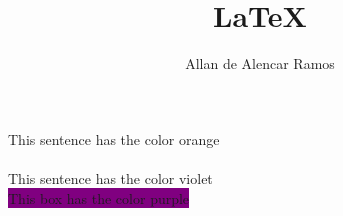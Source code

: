 \documentclass[12pt, a4paper, oneside]{book}
\begin{document}
\title{LaTeX}
\author{Allan de Alencar Ramos} 
\maketitle

\pagecolor{blue}

\textcolor{laranja}{This sentence has the color orange}\\

\color{Aqua}{This sentence has the color aqua}\\
\color{Violet} {This sentence has the color violet}\\

\colorbox{Purple}{This box has the color purple}
\end{document}
